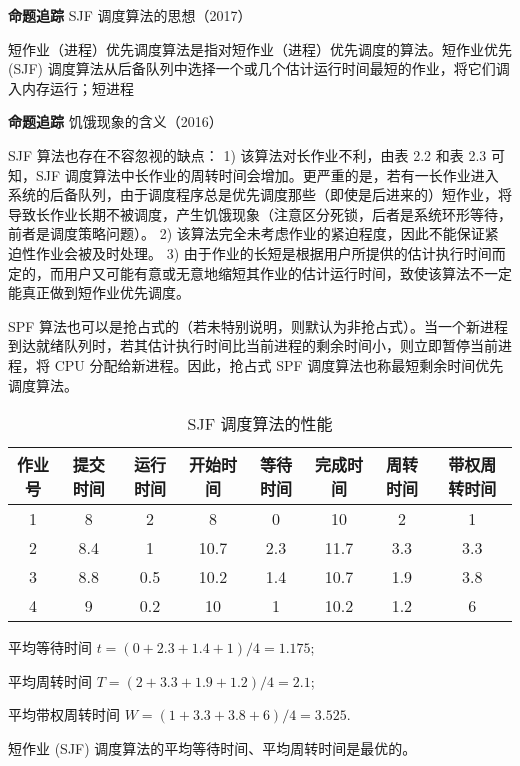 \documentclass{ctexbook}
\begin{document}
	\textbf{命题追踪} SJF 调度算法的思想（2017）
	
	短作业（进程）优先调度算法是指对短作业（进程）优先调度的算法。短作业优先 (SJF) 调度算法从后备队列中选择一个或几个估计运行时间最短的作业，将它们调入内存运行；短进程
	
	\textbf{命题追踪} 饥饿现象的含义（2016）
	
	SJF 算法也存在不容忽视的缺点：
	1) 该算法对长作业不利，由表 2.2 和表 2.3 可知，SJF 调度算法中长作业的周转时间会增加。更严重的是，若有一长作业进入系统的后备队列，由于调度程序总是优先调度那些（即使是后进来的）短作业，将导致长作业长期不被调度，产生饥饿现象（注意区分死锁，后者是系统环形等待，前者是调度策略问题）。
	2) 该算法完全未考虑作业的紧迫程度，因此不能保证紧迫性作业会被及时处理。
	3) 由于作业的长短是根据用户所提供的估计执行时间而定的，而用户又可能有意或无意地缩短其作业的估计运行时间，致使该算法不一定能真正做到短作业优先调度。
	
	SPF 算法也可以是抢占式的（若未特别说明，则默认为非抢占式）。当一个新进程到达就绪队列时，若其估计执行时间比当前进程的剩余时间小，则立即暂停当前进程，将 CPU 分配给新进程。因此，抢占式 SPF 调度算法也称最短剩余时间优先调度算法。
	
	\begin{table}[h]
		\centering
		\caption{SJF 调度算法的性能}
		\label{tab:sjf_performance}
		\begin{tabular}{|c|c|c|c|c|c|c|c|}
			\hline
			作业号 & 提交时间 & 运行时间 & 开始时间 & 等待时间 & 完成时间 & 周转时间 & 带权周转时间 \\
			\hline
			1 & 8 & 2 & 8 & 0 & 10 & 2 & 1 \\
			\hline
			2 & 8.4 & 1 & 10.7 & 2.3 & 11.7 & 3.3 & 3.3 \\
			\hline
			3 & 8.8 & 0.5 & 10.2 & 1.4 & 10.7 & 1.9 & 3.8 \\
			\hline
			4 & 9 & 0.2 & 10 & 1 & 10.2 & 1.2 & 6 \\
			\hline
			
		\end{tabular}
	\end{table}
	
	平均等待时间 $t=(0+2.3+1.4+1)/4=1.175$; 
	
	平均周转时间 $T=(2+3.3+1.9+1.2)/4=2.1$; 
	
	平均带权周转时间 $W=(1+3.3+3.8+6)/4=3.525$. 
	
	\begin{tcolorbox}[colback=gray!10, colframe=black!50, title=注意]
		短作业 (SJF) 调度算法的平均等待时间、平均周转时间是最优的。
	\end{tcolorbox}
	
\end{document}
